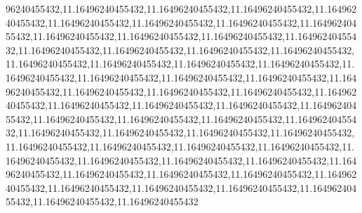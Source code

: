 96240455432,11.16496240455432,11.16496240455432,11.16496240455432,11.16496240455432,11.16496240455432,11.16496240455432,11.16496240455432,11.16496240455432,11.16496240455432,11.16496240455432,11.16496240455432,11.16496240455432,11.16496240455432,11.16496240455432,11.16496240455432,11.16496240455432,11.16496240455432,11.16496240455432,11.16496240455432,11.16496240455432,11.16496240455432,11.16496240455432,11.16496240455432,11.16496240455432,11.16496240455432,11.16496240455432,11.16496240455432,11.16496240455432,11.16496240455432,11.16496240455432,11.16496240455432,11.16496240455432,11.16496240455432,11.16496240455432,11.16496240455432,11.16496240455432,11.16496240455432,11.16496240455432,11.16496240455432,11.16496240455432,11.16496240455432,11.16496240455432,11.16496240455432,11.16496240455432,11.16496240455432,11.16496240455432,11.16496240455432,11.16496240455432,11.16496240455432,11.16496240455432,11.16496240455432,11.16496240455432,11.16496240455432,11.16496240455432,11.16496240455432,11.16496240455432,11.16496240455432,11.16496240455432,11.16496240455432,11.16496240455432
